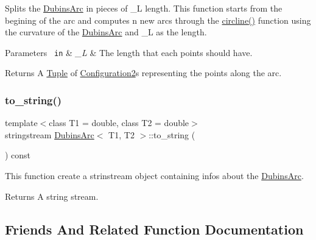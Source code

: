 Splits the {\ttfamily \mbox{\hyperlink{class_dubins_arc}{Dubins\+Arc}}} in pieces of \+\_\+L length. This function starts from the begining of the arc and computes n new arcs through the {\ttfamily \mbox{\hyperlink{dubins_8hh_adef8b363044d7fed558e5b47d8d6a3a0}{circline()}}} function using the curvature of the {\ttfamily \mbox{\hyperlink{class_dubins_arc}{Dubins\+Arc}}} and \+\_\+L as the length. 


\begin{DoxyParams}[1]{Parameters}
\mbox{\texttt{ in}}  & {\em \+\_\+L} & The length that each points should have. \\
\hline
\end{DoxyParams}
\begin{DoxyReturn}{Returns}
A {\ttfamily \mbox{\hyperlink{class_tuple}{Tuple}}} of {\ttfamily \mbox{\hyperlink{class_configuration2}{Configuration2}}}s representing the points along the arc. 
\end{DoxyReturn}
\mbox{\label{class_dubins_arc_aa90c32f88f048e4e17ea79489f44dbfb}} 
\subsubsection{\texorpdfstring{to\_string()}{to\_string()}}
{\footnotesize\ttfamily template$<$class T1 = double, class T2 = double$>$ \\
stringstream \mbox{\hyperlink{class_dubins_arc}{Dubins\+Arc}}$<$ T1, T2 $>$\+::to\+\_\+string (\begin{DoxyParamCaption}{ }\end{DoxyParamCaption}) const\hspace{0.3cm}{\ttfamily [inline]}}

This function create a strinstream object containing infos about the {\ttfamily \mbox{\hyperlink{class_dubins_arc}{Dubins\+Arc}}}. \begin{DoxyReturn}{Returns}
A string stream. 
\end{DoxyReturn}


\subsection{Friends And Related Function Documentation}
\mbox{\label{class_dubins_arc_a9fbd2f7583b614eba51fd90a9def4b51}} 
